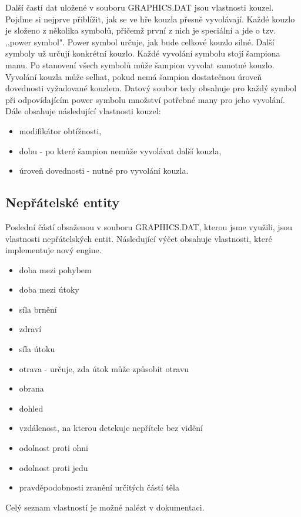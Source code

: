 Další častí dat uložené v souboru GRAPHICS.DAT jsou vlastnosti kouzel. Pojďme si nejprve přiblížit,
jak se ve hře kouzla přesně vyvolávají. Každé kouzlo je složeno z několika symbolů, přičemž první 
z nich je speciální a jde o tzv. ,,power symbol". Power symbol určuje, jak bude celkové kouzlo silné.
Další symboly už určují konkrétní kouzlo. Každé vyvolání symbolu stojí šampiona manu. Po stanovení 
všech symbolů může šampion vyvolat samotné kouzlo. Vyvolání kouzla může selhat, pokud nemá šampion 
dostatečnou úroveň dovednosti vyžadované kouzlem. Datový soubor tedy obsahuje pro každý symbol při odpovídajícím
power symbolu množství potřebné many pro jeho vyvolání. Dále obsahuje následující vlastnosti kouzel\cite{DMSpells}:

\begin{itemize}
\item modifikátor obtížnosti,
\item dobu - po které šampion nemůže vyvolávat další kouzla,
\item úroveň dovednosti - nutné pro vyvolání kouzla.
\end{itemize}

\subsection{Nepřátelské entity}

Poslední částí obsaženou v souboru GRAPHICS.DAT, kterou jsme využili, jsou vlastnosti nepřátelských entit.
Následující výčet obsahuje vlastnosti, které implementuje nový engine. 
\begin{itemize}
\item doba mezi pohybem 
\item doba mezi útoky
\item síla brnění
\item zdraví
\item síla útoku
\item otrava - určuje, zda útok může způsobit otravu
\item obrana 
\item dohled 
\item vzdálenost, na kterou detekuje nepřítele bez vidění 
\item odolnost proti ohni
\item odolnost proti jedu
\item pravděpodobnosti zranění určitých částí těla
\end{itemize}

Celý seznam vlastností je možné nalézt v dokumentaci\cite{DMCreatures}.


